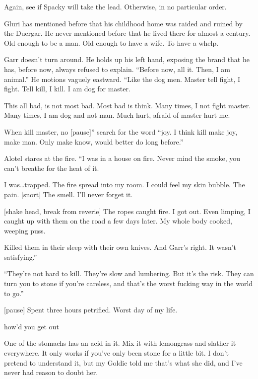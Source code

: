 \begin{multicols}{2}
Again, see if Spacky will take the lead.
Otherwise, in no particular order.

\hline

Gluri has mentioned before that his childhood home was raided and ruined by the Duergar.
He never mentioned before that he lived there for almost a century.
Old enough to be a man.
Old enough to have a wife.
To have a whelp.

\hline

Garr doesn't turn around.
He holds up his left hand, exposing the brand that he has, before now, always refused to explain.
``Before now, all it.
Then, I am animal.''
He motions vaguely eastward.
``Like the dog men.
Master tell fight, I fight.
Tell kill, I kill.
I am dog for master.

This all bad, is not most bad.
Most bad is think.
Many times, I not fight master.
Many times, I am dog and not man.
Much hurt, afraid of master hurt me.

When kill master, no [pause]'' search for the word ``joy.
I think kill make joy, make man.
Only make know, would better do long before.''

\hline

Alotel stares at the fire.
``I was in a house on fire.
Never mind the smoke, you can't breathe for the heat of it.

I was\dots trapped.
The fire spread into my room.
I could feel my skin bubble.
The pain.
[snort]
The smell.
I'll never forget it.

[shake head, break from reverie]
The ropes caught fire.
I got out.
Even limping, I caught up with them on the road a few days later.
My whole body cooked, weeping puss.

Killed them in their sleep with their own knives.
And Garr's right.
It wasn't satisfying.''

\hline

``They're not hard to kill.
They're slow and lumbering.
But it's the risk.
They can turn you to stone if you're careless, and that's the worst fucking way in the world
to go.''

[pause]
Spent three hours petrified.
Worst day of my life.

how'd you get out

One of the stomachs has an acid in it.
Mix it with lemongrass and slather it everywhere.
It only works if you've only been stone for a little bit.
I don't pretend to understand it, but my Goldie told me that's what she did, and I've never had
reason to doubt her.


\end{multicols}
